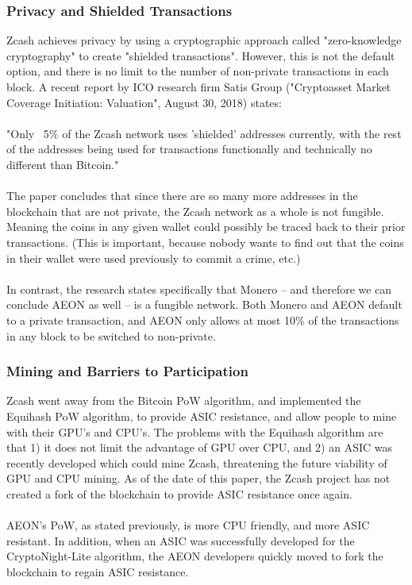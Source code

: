 \subsubsection{Privacy and Shielded Transactions}
Zcash achieves privacy by using a cryptographic approach called "zero-knowledge cryptography" to create "shielded transactions".  However, this is not the default option, and there is no limit to the number of non-private transactions in each block.  A recent report by ICO research firm Satis Group ("Cryptoasset Market Coverage Initiation: Valuation", August 30, 2018) states:\\
\\ 
"Only ~5\%  of the Zcash network uses 'shielded' addresses currently, with the rest of the addresses being used for transactions functionally and technically no different than Bitcoin."\\
\\
The paper concludes that since there are so many more addresses in the blockchain that are not private, the Zcash network as a whole is not fungible.  Meaning the coins in any given wallet could possibly be traced back to their prior transactions.  (This is important, because nobody wants to find out that the coins in their wallet were used previously to commit a crime, etc.)\\
\\
In contrast, the research states specifically that Monero -- and therefore we can conclude AEON as well -- is a fungible network.  Both Monero and AEON default to a private transaction, and AEON only allows at most 10\% of the transactions in any block to be switched to non-private.

\subsubsection{Mining and Barriers to Participation}
Zcash went away from the Bitcoin PoW algorithm, and implemented the Equihash PoW algorithm, to provide ASIC resistance, and allow people to mine with their GPU’s and CPU’s.  The problems with the Equihash algorithm are that 1) it does not limit the advantage of GPU over CPU, and 2) an ASIC was recently developed which could mine Zcash, threatening the future viability of GPU and CPU mining.   As of the date of this paper, the Zcash project has not created a fork of the blockchain to provide ASIC resistance once again.\\
\\
AEON's PoW, as stated previously, is more CPU friendly, and more ASIC resistant.  In addition, when an ASIC was successfully developed for the CryptoNight-Lite algorithm, the AEON developers quickly moved to fork the blockchain to regain ASIC resistance.

